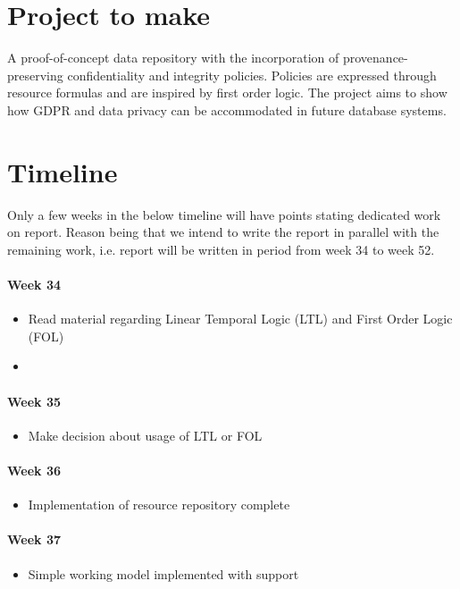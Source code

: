 \section{Project to make}
A proof-of-concept data repository with the incorporation of provenance-preserving confidentiality and integrity policies. Policies are expressed through resource formulas and are inspired by first order logic. The project aims to show how GDPR and data privacy can be accommodated in future database systems.

\section{Timeline}
Only a few weeks in the below timeline will have points stating dedicated work on report. Reason being that we intend to write the report in parallel with the remaining work, i.e. report will be written in period from week 34 to week 52.

\paragraph{Week 34}
\begin{itemize}
    \item Read material regarding Linear Temporal Logic (LTL) and First Order Logic (FOL)
    \item 
\end{itemize}
\paragraph{Week 35}
\begin{itemize}
    \item Make decision about usage of LTL or FOL
\end{itemize}
\paragraph{Week 36}
\begin{itemize}
    \item Implementation of resource repository complete
\end{itemize}
\paragraph{Week 37}
\begin{itemize}
    \item Simple working model implemented with support 
\end{itemize}
